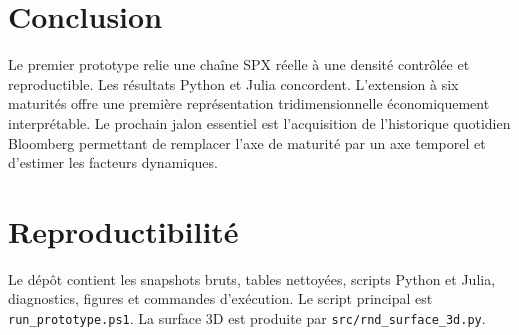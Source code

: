 \documentclass[11pt,a4paper]{article}
\numberwithin{equation}{section}
\begin{document}
\section{Conclusion}
Le premier prototype relie une chaîne SPX réelle à une densité contrôlée et
reproductible. Les résultats Python et Julia concordent. L'extension à six maturités
offre une première représentation tridimensionnelle économiquement interprétable.
Le prochain jalon essentiel est l'acquisition de l'historique quotidien Bloomberg permettant
de remplacer l'axe de maturité par un axe temporel et d'estimer les facteurs dynamiques.

\appendix
\section{Reproductibilité}
Le dépôt contient les snapshots bruts, tables nettoyées, scripts Python et Julia,
diagnostics, figures et commandes d'exécution. Le script principal est
\texttt{run\_prototype.ps1}. La surface 3D est produite par
\texttt{src/rnd\_surface\_3d.py}.



\end{document}
